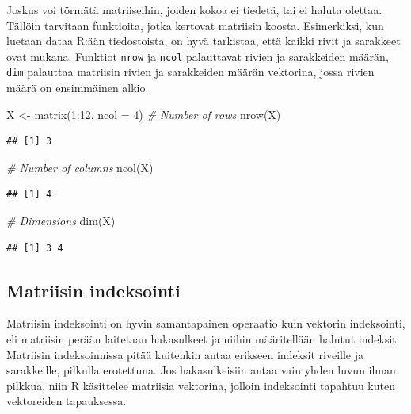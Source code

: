 \documentclass[
]{book}
\newenvironment{Shaded}{\begin{snugshade}}{\end{snugshade}}
\newcommand{\AttributeTok}[1]{\textcolor[rgb]{0.77,0.63,0.00}{#1}}
\newcommand{\CommentTok}[1]{\textcolor[rgb]{0.56,0.35,0.01}{\textit{#1}}}
\newcommand{\DecValTok}[1]{\textcolor[rgb]{0.00,0.00,0.81}{#1}}
\newcommand{\FunctionTok}[1]{\textcolor[rgb]{0.00,0.00,0.00}{#1}}
\newcommand{\NormalTok}[1]{#1}
\newcommand{\OtherTok}[1]{\textcolor[rgb]{0.56,0.35,0.01}{#1}}
\newcommand{\SpecialCharTok}[1]{\textcolor[rgb]{0.00,0.00,0.00}{#1}}
\begin{document}
Joskus voi törmätä matriiseihin, joiden kokoa ei tiedetä, tai ei haluta olettaa. Tällöin tarvitaan funktioita, jotka kertovat matriisin koosta. Esimerkiksi, kun luetaan dataa R:ään tiedostoista, on hyvä tarkistaa, että kaikki rivit ja sarakkeet ovat mukana. Funktiot \texttt{nrow} ja \texttt{ncol} palauttavat rivien ja sarakkeiden määrän, \texttt{dim} palauttaa matriisin rivien ja sarakkeiden määrän vektorina, jossa rivien määrä on ensimmäinen alkio.

\begin{Shaded}
\begin{Highlighting}[]
\NormalTok{X }\OtherTok{\textless{}{-}} \FunctionTok{matrix}\NormalTok{(}\DecValTok{1}\SpecialCharTok{:}\DecValTok{12}\NormalTok{, }\AttributeTok{ncol =} \DecValTok{4}\NormalTok{)}
\CommentTok{\# Number of rows}
\FunctionTok{nrow}\NormalTok{(X)}
\end{Highlighting}
\end{Shaded}

\begin{verbatim}
## [1] 3
\end{verbatim}

\begin{Shaded}
\begin{Highlighting}[]
\CommentTok{\# Number of columns}
\FunctionTok{ncol}\NormalTok{(X)}
\end{Highlighting}
\end{Shaded}

\begin{verbatim}
## [1] 4
\end{verbatim}

\begin{Shaded}
\begin{Highlighting}[]
\CommentTok{\# Dimensions}
\FunctionTok{dim}\NormalTok{(X)}
\end{Highlighting}
\end{Shaded}

\begin{verbatim}
## [1] 3 4
\end{verbatim}

\hypertarget{matriisin-indeksointi}{%
\subsection{Matriisin indeksointi}\label{matriisin-indeksointi}}

Matriisin indeksointi on hyvin samantapainen operaatio kuin vektorin indeksointi, eli matriisin perään laitetaan hakasulkeet ja niihin määritellään halutut indeksit. Matriisin indeksoinnissa pitää kuitenkin antaa erikseen indeksit riveille ja sarakkeille, pilkulla erotettuna. Jos hakasulkeisiin antaa vain yhden luvun ilman pilkkua, niin R käsittelee matriisia vektorina, jolloin indeksointi tapahtuu kuten vektoreiden tapauksessa.
\end{document}
